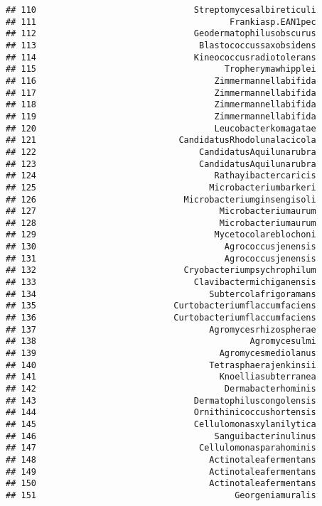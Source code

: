 \documentclass[
]{article}
\begin{document}
\begin{verbatim}
## 110                               Streptomycesalbireticuli
## 111                                      Frankiasp.EAN1pec
## 112                               Geodermatophilusobscurus
## 113                                Blastococcussaxobsidens
## 114                               Kineococcusradiotolerans
## 115                                     Tropherymawhipplei
## 116                                   Zimmermannellabifida
## 117                                   Zimmermannellabifida
## 118                                   Zimmermannellabifida
## 119                                   Zimmermannellabifida
## 120                                   Leucobacterkomagatae
## 121                            CandidatusRhodolunalacicola
## 122                                CandidatusAquilunarubra
## 123                                CandidatusAquilunarubra
## 124                                   Rathayibactercaricis
## 125                                  Microbacteriumbarkeri
## 126                             Microbacteriumginsengisoli
## 127                                    Microbacteriumaurum
## 128                                    Microbacteriumaurum
## 129                                   Mycetocolareblochoni
## 130                                     Agrococcusjenensis
## 131                                     Agrococcusjenensis
## 132                             Cryobacteriumpsychrophilum
## 133                               Clavibactermichiganensis
## 134                                  Subtercolafrigoramans
## 135                           Curtobacteriumflaccumfaciens
## 136                           Curtobacteriumflaccumfaciens
## 137                                  Agromycesrhizospherae
## 138                                          Agromycesulmi
## 139                                    Agromycesmediolanus
## 140                                  Tetrasphaerajenkinsii
## 141                                    Knoelliasubterranea
## 142                                     Dermabacterhominis
## 143                               Dermatophiluscongolensis
## 144                               Ornithinicoccushortensis
## 145                               Cellulomonasxylanilytica
## 146                                   Sanguibacterinulinus
## 147                                Cellulomonasparahominis
## 148                                  Actinotaleafermentans
## 149                                  Actinotaleafermentans
## 150                                  Actinotaleafermentans
## 151                                       Georgeniamuralis

\end{verbatim}
\end{document}
